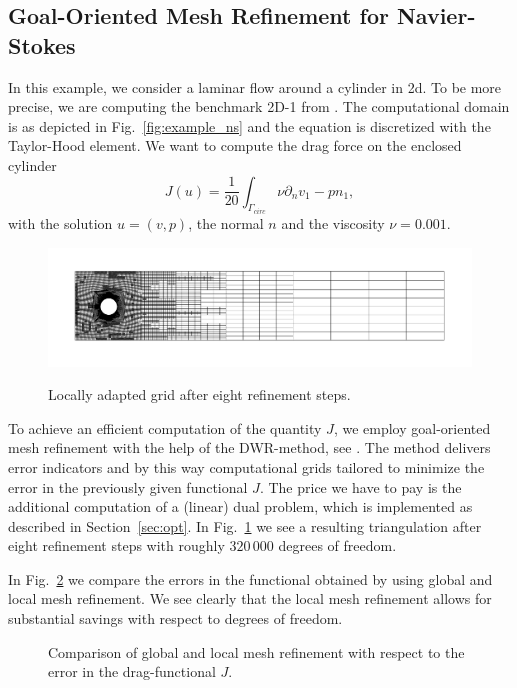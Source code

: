\documentclass[smallextended]{svjour3}       %
\numberwithin{equation}{section}
\begin{document}
\subsection{Goal-Oriented Mesh Refinement for Navier-Stokes}
In this example, we consider a laminar flow around a cylinder in 2d. To be more precise, we are computing the benchmark 2D-1 from \cite{TuSchae96}. The computational domain is as depicted in Fig.~\ref{fig:example_ns} and the equation is discretized with the Taylor-Hood  element. We want to compute the drag force on the enclosed cylinder
\begin{equation}
J(u) = \frac 1 {20} \int_{\Gamma_{circ}} \nu\partial_nv _1 - pn_1,
\end{equation}
with the solution $u = (v,p)$, the normal $n$ and the viscosity $\nu = 0.001$.

\begin{figure}[hbt]
\centering
{\includegraphics[trim = 50mm 50mm 50mm 50mm, clip, width=\textwidth]{Pictures/local_grid_NSv2.png}}
\caption{Locally adapted grid after eight refinement steps.}
\label{fig:NS_local_grid}
\end{figure}

To achieve an efficient computation of the quantity $J$, we employ goal-oriented mesh refinement with the help of the DWR-method, see \cite{BeRa96}. The method delivers error indicators and by this way computational grids tailored to minimize the error in the previously given functional $J$. The price we have to pay is the additional computation of a (linear) dual problem, which is implemented as described in Section~\ref{sec:opt}. In Fig.~\ref{fig:NS_local_grid} we see a resulting triangulation after eight refinement steps with roughly $320\,000$ degrees of freedom.

In Fig.~\ref{fig:NS_comparison} we compare the errors in the functional obtained by using global and local mesh refinement. We see clearly that the local mesh refinement allows for substantial savings with respect to degrees of freedom.

\begin{figure}[hbt]
\centering
\resizebox{0.73\textwidth}{!}{}
\caption{Comparison of global and local mesh refinement with respect to the error in the drag-functional $J$.}
\label{fig:NS_comparison}
\end{figure}
\end{document}
